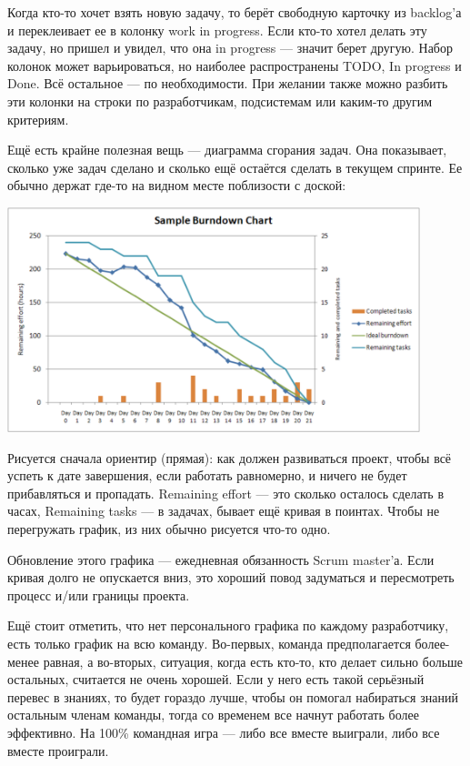 \documentclass{../../text-style}
\begin{document}
Когда кто-то хочет взять новую задачу, то берёт свободную карточку из backlog’а и переклеивает ее в колонку work in progress. Если кто-то хотел делать эту задачу, но пришел и увидел, что она in progress --- значит берет другую. Набор колонок может варьироваться, но наиболее распространены TODO, In progress и Done. Всё остальное --- по необходимости. При желании также можно разбить эти колонки на строки по разработчикам, подсистемам или каким-то другим критериям.

Ещё есть крайне полезная вещь --- диаграмма сгорания задач. Она показывает, сколько уже задач сделано и сколько ещё остаётся сделать в текущем спринте. Ее обычно держат где-то на видном месте поблизости с доской: 

\begin{center}
    \includegraphics[width=0.9\textwidth]{burndownChart.png}
\end{center}

Рисуется сначала ориентир (прямая): как должен развиваться проект, чтобы всё успеть к дате завершения, если работать равномерно, и ничего не будет прибавляться и пропадать. Remaining effort --- это сколько осталось сделать в часах, Remaining tasks --- в задачах, бывает ещё кривая в поинтах. Чтобы не перегружать график, из них обычно рисуется что-то одно.

Обновление этого графика --- ежедневная обязанность Scrum master’а. Если кривая долго не опускается вниз, это хороший повод задуматься и пересмотреть процесс и/или границы проекта.

Ещё стоит отметить, что нет персонального графика по каждому разработчику, есть только график на всю команду. Во-первых, команда предполагается более-менее равная, а во-вторых, ситуация, когда есть кто-то, кто делает сильно больше остальных, считается не очень хорошей. Если у него есть такой серьёзный перевес в знаниях, то будет гораздо лучше, чтобы он помогал набираться знаний остальным членам команды, тогда со временем все начнут работать более эффективно. На 100\% командная игра --- либо все вместе выиграли, либо все вместе проиграли.
\end{document}
